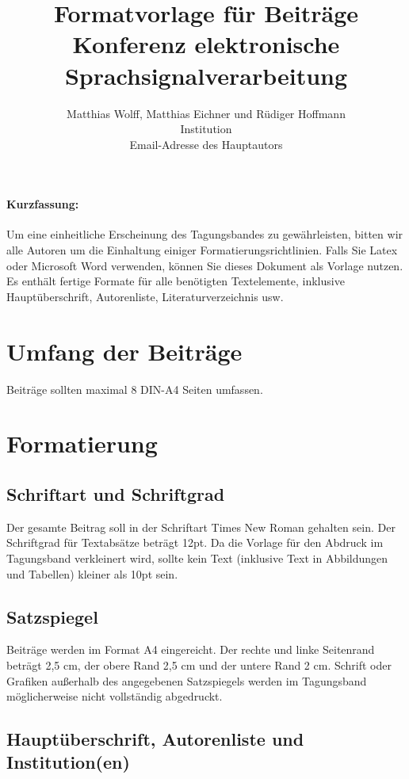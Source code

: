 \documentclass[12pt,a4paper]{article}
\title{
  Formatvorlage für Beiträge Konferenz elektronische Sprachsignalverarbeitung
}
\author{
  Matthias Wolff, Matthias Eichner und Rüdiger Hoffmann\\[6pt]
  Institution\\
  Email-Adresse des Hauptautors
}
\date{}
\renewcommand{\abstractname}%
    {Kurzfassung}%
\renewenvironment{abstract}{%
  \vspace{-0.75cm}
  \begin{center}
  \begin{minipage}{13.9cm}
  \paragraph{\abstractname:}
}{%
  \end{minipage}
  \end{center}
}
\begin{document}

\maketitle

\begin{abstract}
  Um eine einheitliche Erscheinung des Tagungsbandes zu gewährleisten, bitten wir alle Autoren 
  um die Einhaltung einiger Formatierungsrichtlinien. Falls Sie Latex oder Microsoft Word verwenden, 
  können Sie dieses Dokument als Vorlage nutzen. Es enthält fertige Formate für alle benötigten 
  Textelemente, inklusive Hauptüberschrift, Autorenliste, Literaturverzeichnis usw.
\end{abstract}

\section{Umfang der Beiträge}

Beiträge sollten maximal 8 DIN-A4 Seiten umfassen.

\section{Formatierung}

\subsection{Schriftart und Schriftgrad}

Der gesamte Beitrag soll in der Schriftart Times New Roman gehalten sein. Der Schriftgrad für 
Textabsätze beträgt 12pt. Da die Vorlage für den Abdruck im Tagungsband verkleinert wird, sollte 
kein Text (inklusive Text in Abbildungen und Tabellen) kleiner als 10pt sein. 

\subsection{Satzspiegel}

Beiträge werden im Format A4 eingereicht. Der rechte und linke Seitenrand beträgt 2,5 cm, der 
obere Rand 2,5 cm und der untere Rand 2 cm. Schrift oder Grafiken außerhalb des angegebenen 
Satzspiegels werden im Tagungsband möglicherweise nicht vollständig abgedruckt. 

\subsection{Hauptüberschrift, Autorenliste und Institution(en)}
\end{document}
